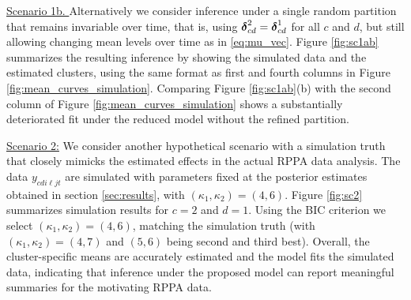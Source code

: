 \underline{Scenario 1b. }
Alternatively we consider inference under a single random partition
that remains invariable over time, that is, using
$\mbox{\boldmath $\delta$}^2_{cd}=\mbox{\boldmath $\delta$}^1_{cd}$ for all $c$ and $d$, but still allowing changing mean levels over time
as in \eqref{eq:mu_vec}.
Figure \ref{fig:sc1ab} summarizes the resulting inference by showing the
simulated data and the estimated clusters, using the same format as
first and fourth columns in Figure  \ref{fig:mean_curves_simulation}.
Comparing Figure \ref{fig:sc1ab}(b) with the second column of Figure
\ref{fig:mean_curves_simulation} shows a substantially deteriorated
fit under the reduced model without the refined partition.
\smallskip



\underline{Scenario 2:}
We consider another hypothetical scenario with a simulation truth that
closely mimicks the estimated effects in the actual RPPA data
analysis. 
The data $y_{cdi\ell j t}$ are simulated with parameters
fixed at the posterior estimates obtained in section \ref{sec:results}, with $(\kappa_1, \kappa_2)=(4,6)$.
%
Figure \ref{fig:sc2} summarizes simulation results for $c=2$ and $d=1$. 
Using the BIC criterion we select $(\kappa_1,\kappa_2)=(4,6)$,
matching the simulation truth (with $(\kappa_1,\kappa_2)=(4,7)$ and
$(5,6)$ being second and third best). Overall, the cluster-specific means are accurately estimated and
the model fits the simulated data, indicating that inference under
the proposed model can report meaningful summaries for the motivating RPPA data.

